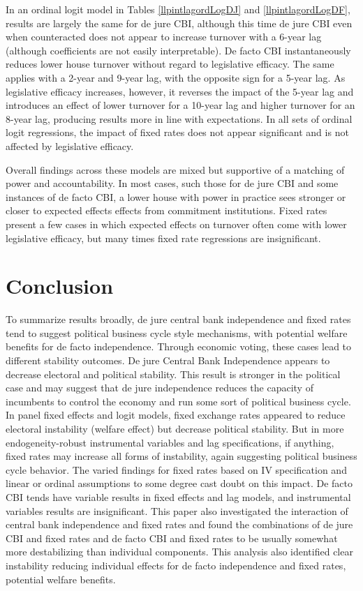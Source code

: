 \documentclass{article}
\begin{document}
    In an ordinal logit model in Tables \ref{llpintlagordLogDJ} and \ref{llpintlagordLogDF}, results are largely the same for de jure CBI, although this time de jure CBI even when counteracted does not appear to increase turnover with a 6-year lag (although coefficients are not easily interpretable). De facto CBI instantaneously reduces lower house turnover without regard to legislative efficacy. The same applies with a 2-year and 9-year lag, with the opposite sign for a 5-year lag. As legislative efficacy increases, however, it reverses the impact of the 5-year lag and introduces an effect of lower turnover for a 10-year lag and higher turnover for an 8-year lag, producing results more in line with expectations. In all sets of ordinal logit regressions, the impact of fixed rates does not appear significant and is not affected by legislative efficacy.

    Overall findings across these models are mixed but supportive of a matching of power and accountability. In most cases, such those for de jure CBI and some instances of de facto CBI, a lower house with power in practice sees stronger or closer to expected effects effects from commitment institutions. Fixed rates present a few cases in which expected effects on turnover often come with lower legislative efficacy, but many times fixed rate regressions are insignificant.
    
    \section*{Conclusion}

    To summarize results broadly, de jure central bank independence and fixed rates tend to suggest political business cycle style mechanisms, with potential welfare benefits for de facto independence. Through economic voting, these cases lead to different stability outcomes. De jure Central Bank Independence appears to decrease electoral and political stability. This result is stronger in the political case and may suggest that de jure independence reduces the capacity of incumbents to control the economy and run some sort of political business cycle.  In panel fixed effects and logit models, fixed exchange rates appeared to reduce electoral instability (welfare effect) but decrease political stability. But in more endogeneity-robust instrumental variables and lag specifications, if anything, fixed rates may increase all forms of instability, again suggesting political business cycle behavior. The varied findings for fixed rates based on IV specification and linear or ordinal assumptions to some degree cast doubt on this impact. De facto CBI tends have variable results in fixed effects and lag models, and instrumental variables results are insignificant. This paper also investigated the interaction of central bank independence and fixed rates and found the combinations of de jure CBI and fixed rates and de facto CBI and fixed rates to be usually somewhat more destabilizing than individual components. This analysis also identified clear instability reducing individual effects for de facto independence and fixed rates, potential welfare benefits.
\end{document}
